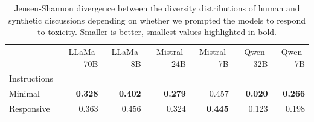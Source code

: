 \begin{table}[ht]
\caption{Jensen-Shannon divergence between the diversity distributions of human and synthetic discussions depending on whether we prompted the models to respond to toxicity. Smaller is better, smallest values highlighted in bold.}
\label{tab:divergence-user_prompts}
\begin{tabular}{lrrrrrr}
\toprule
& LLaMa-70B & LLaMa-8B & Mistral-24B & Mistral-7B & Qwen-32B & Qwen-7B \\
Instructions &  &  &  &  &  &  \\
\midrule
Minimal & \textbf{0.328} & \textbf{0.402} & \textbf{0.279} & 0.457 & \textbf{0.020} & \textbf{0.266} \\
Responsive & 0.363 & 0.456 & 0.324 & \textbf{0.445} & 0.123 & 0.198 \\
\bottomrule
\end{tabular}
\end{table}

